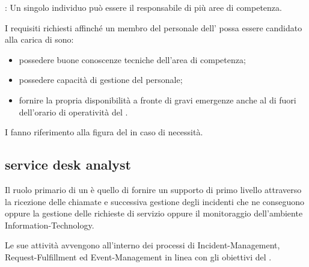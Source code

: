 : Un singolo individuo può essere il responsabile di più aree di competenza.

I requisiti richiesti affinché un membro del personale dell'\entity{} possa essere candidato alla carica di  sono:

\begin{itemize}
\item{possedere buone conoscenze tecniche dell'area di competenza;}
\item{possedere capacità di gestione del personale;}
\item{fornire la propria disponibilità a fronte di gravi emergenze anche al di fuori dell'orario di operatività del .}
\end{itemize}

I  fanno riferimento alla figura del  in caso di necessità.

\subsection[Service Desk Analyst]{service desk analyst}
\label{sd-sd-analyst}
Il ruolo primario di un  è quello di fornire un supporto di primo livello attraverso la ricezione delle chiamate e successiva gestione degli incidenti che ne conseguono oppure la gestione delle richieste di servizio oppure il monitoraggio dell'ambiente \acs{Information-Technology}.

Le sue attività avvengono all'interno dei processi di \acf{Incident-Management}, \acf{Request-Fulfillment} ed \acf{Event-Management} in linea con gli obiettivi del .